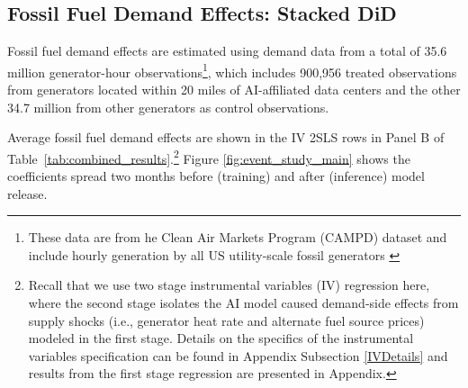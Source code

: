 \documentclass[a4paper,fleqn,longmktitle]{cas-sc}
\newcommand{\nb}[1]{\textcolor{blue}{NB[#1]}}
\theoremstyle{plain}
\theoremstyle{definition}
\begin{document}

\subsection{Fossil Fuel Demand Effects: Stacked DiD}
\label{subsec:fossil-fuel-demand-results}
 Fossil fuel demand effects are estimated using demand data from a total of 35.6 million generator-hour observations\footnote{These data are from he Clean Air Markets Program (CAMPD) dataset and include hourly generation by all US utility-scale fossil generators \cite{EPA_CAPMD_PowerSector2022}}, which includes 900,956 treated observations from generators located within 20 miles of AI-affiliated data centers and the other 34.7 million from other generators as control observations.



Average fossil fuel demand effects are shown in the IV 2SLS rows in Panel B of Table~\ref{tab:combined_results}.\footnote{Recall that we use two stage instrumental variables (IV) regression here, where the second stage isolates the AI model caused demand-side effects from supply shocks (i.e., generator heat rate and alternate fuel source prices) modeled in the first stage. Details on the specifics of the instrumental variables specification can be found in Appendix Subsection \ref{IVDetails} and results from the first stage regression are presented in Appendix.}  Figure \ref{fig:event_study_main} shows the coefficients spread two months before (training) and after (inference) model release.
\end{document}
